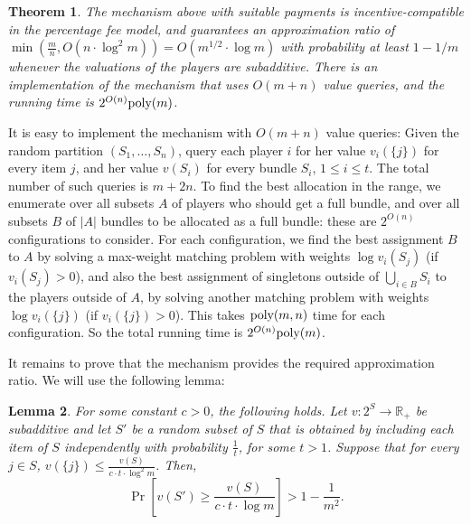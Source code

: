 \documentclass{article}
\newtheorem{theorem}{Theorem}\newtheorem{lemma}[theorem]{Lemma}\newtheorem{proposition}[theorem]{Proposition}\newtheorem{corollary}[theorem]{Corollary}\newtheorem{definition}[theorem]{Definition}\newtheorem{claim}[theorem]{Claim}\newtheorem*{claim*}{Claim}\newenvironment{subproof}{\begin{proof}[Proof of claim]}{\end{proof}}
\newcommand{\R}{\mathbb{R}}
\newcommand{\poly}{\hbox{poly}}
\begin{document}
\begin{theorem}
The mechanism above with suitable payments is incentive-compatible in the percentage fee model, and guarantees an approximation ratio of $\min(\frac m n, O(n\cdot \log^2m)) = O({m}^{1/2} \cdot \log m)$ with probability at least $1-1/m$ whenever the valuations of the players are subadditive. There is an implementation of the mechanism that uses $O(m+n)$ value queries, and the running time is $2^{O(n)} \poly(m)$.
\end{theorem}

It is easy to implement the mechanism with $O(m+n)$ value queries: Given the random partition $(S_1,\ldots,S_n)$, query each player $i$ for her value $v_i(\{j\})$ for every item $j$, and her value $v(S_i)$ for every bundle $S_i$, $1\leq i\leq t$. The total number of such queries is $m+2n$. To find the best allocation in the range, we enumerate over all subsets $A$ of players who should get a full bundle, and over all subsets $B$ of $|A|$ bundles to be allocated as a full bundle: these are $2^{O(n)}$ configurations to consider. For each configuration, we find the best assignment $B$ to $A$ by solving a max-weight matching problem with weights $\log v_i(S_j)$ (if $v_i(S_j)>0$), and also the best assignment of singletons outside of $\bigcup_{i \in B} S_i$ to the players outside of $A$, by solving another matching problem with weights $\log v_i(\{j\})$ (if $v_i(\{j\})>0$). This takes $\poly(m,n)$ time for each configuration. So the total running time is $2^{O(n)} \poly(m)$. 




It remains to prove that the mechanism provides the required approximation ratio. We will use the following lemma:

\begin{lemma}\label{lemma:subadditive-lower-tail}
For some constant $c>0$, the following holds. Let $v:2^S \to \R_+$ be subadditive and let $S'$ be a random subset of $S$ that is obtained by including each item of $S$ independently with probability $\frac 1 t$, for some $t>1$. Suppose that for every  $j \in S$, $v(\{j\}) \leq \frac {v(S)} {c\cdot t\cdot \log^2 m}$. Then, 
$$\Pr\left[v(S') \geq \frac {v(S)} {c\cdot t\cdot \log m} \right] > 1 - \frac{1}{m^2}.$$
\end{lemma}
\end{document}
